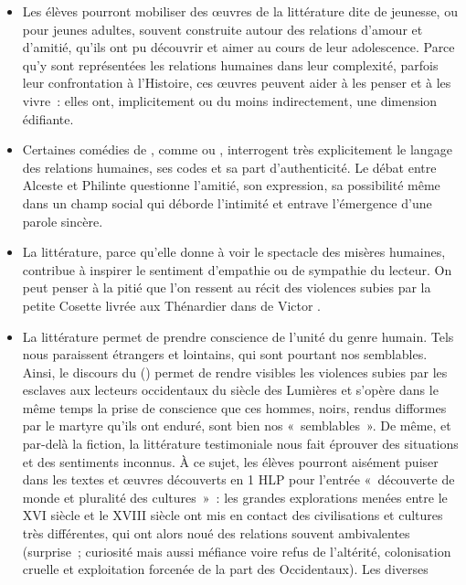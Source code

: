 {\begin{itemize}
\item Les élèves pourront mobiliser des œuvres de la littérature dite de jeunesse, ou pour
jeunes adultes, souvent construite autour des relations d'amour et d'amitié, qu'ils ont
pu découvrir et aimer au cours de leur adolescence. Parce qu'y sont représentées les
relations humaines dans leur complexité, parfois leur confrontation à l'Histoire, ces
œuvres peuvent aider à les penser et à les vivre~: elles ont, implicitement ou du moins
indirectement, une dimension édifiante.
\item Certaines comédies de , comme  ou , interrogent
très explicitement le langage des relations humaines, ses codes et sa part
d'authenticité. Le débat entre Alceste et Philinte questionne l'amitié, son expression,
sa possibilité même dans un champ social qui déborde l'intimité et entrave
l'émergence d'une parole sincère.
\item La littérature, parce qu'elle donne à voir le spectacle des misères humaines, contribue
à inspirer le sentiment d'empathie ou de sympathie du lecteur. On peut penser à la
pitié que l'on ressent au récit des violences subies par la petite Cosette livrée aux
Thénardier dans  de Victor .
\item La littérature permet de prendre conscience de l'unité du genre humain. Tels nous
paraissent étrangers et lointains, qui sont pourtant nos semblables. Ainsi, le discours
du  () permet de rendre visibles les violences subies par les
esclaves aux lecteurs occidentaux du siècle des Lumières et s'opère dans le même
temps la prise de conscience que ces hommes, noirs, rendus difformes par le martyre
qu'ils ont enduré, sont bien nos «~semblables~». De même, et par-delà la fiction, la
littérature testimoniale nous fait éprouver des situations et des sentiments inconnus. À ce sujet, les élèves pourront aisément puiser dans les textes et œuvres découverts en
1\iere{} HLP pour l'entrée «~découverte de monde et pluralité des cultures~»~: les grandes
explorations menées entre le XVI\ieme{} siècle et le XVIII\ieme{} siècle ont mis en contact des
civilisations et cultures très différentes, qui ont alors noué des relations souvent
ambivalentes (surprise~; curiosité mais aussi méfiance voire refus de l'altérité,
colonisation cruelle et exploitation forcenée de la part des Occidentaux). Les diverses

\end{itemize}}
